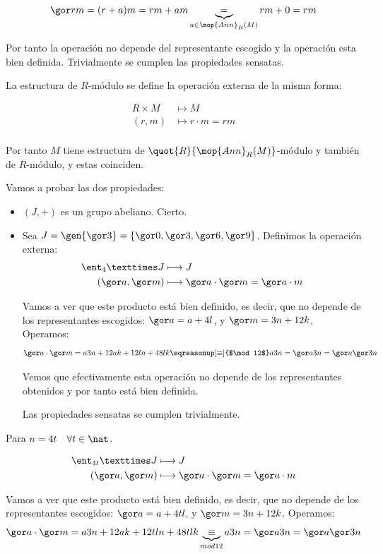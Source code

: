 \begin{problem}[1]
\begin{enumerate}
		$$\cls{r} m = (r+a)m= rm+am \underbrace{=}_{a \in \mop{Ann}_R(M)} rm + 0 = rm$$

		Por tanto la operación no depende del representante escogido y la operación esta bien definida. Trivialmente se cumplen las propiedades sensatas.
	\end{enumerate}

	La estructura de $R$-módulo se define la operación externa de la misma forma:

	\begin{align*}
		R × M & \longmapsto  M \\
		(r,m) & \longmapsto  r\cdot m = rm \\
	\end{align*}

	Por tanto $M$ tiene estructura de  $\quot{R}{\mop{Ann}_R(M)}$-módulo y también de $R$-módulo, y estas coinciden.

	\spart Vamos a probar las dos propiedades:
	\begin{itemize}
		\item $(J,+)$ es un grupo abeliano. Cierto.
		\item  Sea $J=\gen{\cls{3}}=\{ \cls{0}, \cls{3}, \cls{6}, \cls{9} \}$. Definimos la operación externa:
		\begin{align*}
		\ent_4 × J & \longmapsto  J \\
		(\cls{a},\cls{m}) & \longmapsto  \cls{a}\cdot \cls{m} =\cls{a\cdot m} \\
		\end{align*}

		Vamos a ver que este producto está bien definido, es decir, que no depende de los representantes escogidos: $\cls{a}=a+4l$, y $\cls{m}=3n+12k$. Operamos:
		$$\cls{a}\cdot \cls{m}=a3n+12ak+12ln+48lk \eqreasonup[\equiv]{$\mod 12$} a3n=\cls{a3n}=\cls{a}\cls{3n}$$

		Vemos que efectivamente esta operación no depende de los representantes obtenidos y por tanto está bien definida.

		Las propiedades sensatas se cumplen trivialmente.
	\end{itemize}

	\spart Para $n=4t \quad \forall t \in \nat$.

	\begin{align*}
	\ent_{4t} × J & \longmapsto  J \\
	(\cls{a},\cls{m}) & \longmapsto  \cls{a}\cdot \cls{m} =\cls{a\cdot m} \\
	\end{align*}

	Vamos a ver que este producto está bien definido, es decir, que no depende de los representantes escogidos: $\cls{a}=a+4tl$, y $\cls{m}=3n+12k$. Operamos:
	$$\cls{a}\cdot \cls{m}=a3n+12ak+12tln+48tlk \underbrace{\equiv}_{mod 12} a3n=\cls{a3n}=\cls{a}\cls{3n}$$

\end{problem}

